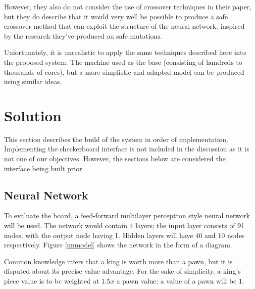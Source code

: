\documentclass[12pt,a4paper]{article}
\begin{document}
        However, they also do not consider the use of crossover techniques in their paper, but they do describe that it would very well be possible to produce a safe crossover method that can exploit the structure of the neural network, inspired by the research they've produced on safe mutations.

        Unfortunately, it is unrealistic to apply the same techniques described here into the proposed system. The machine used as the base (consisting of hundreds to thousands of cores), but a more simplistic and adapted model can be produced using similar ideas. 

\section{Solution}


 
    This section describes the build of the system in order of implementation. Implementing the checkerboard interface is not included in the discussion as it is not one of our objectives. However, the sections below are considered the interface being built prior. 

    \subsection{Neural Network}
        To evaluate the board, a feed-forward multilayer perceptron style neural network will be used. The network would contain 4 layers; the input layer consists of 91 nodes, with the output node having 1. Hidden layers will have 40 and 10 nodes respectively. Figure \ref{nnmodel} shows the network in the form of a diagram.

        Common knowledge infers that a king is worth more than a pawn, but it is disputed about its precise value advantage. For the sake of simplicity, a king's piece value is to be weighted at $1.5x$ a pawn value; a value of a pawn will be $1$. 
\end{document}
